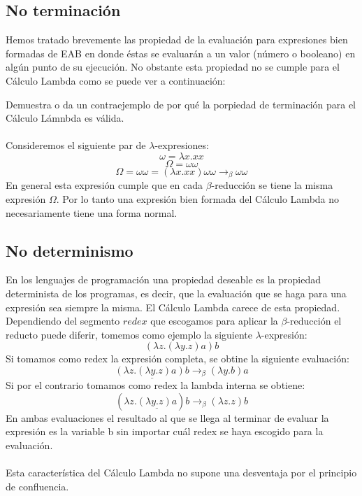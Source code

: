                 \subsection{No terminación}
                    Hemos tratado brevemente las propiedad de la evaluación para expresiones bien formadas de \textsf{EAB} en donde éstas se evaluarán a un valor (número o booleano) en algún punto de su ejecución. 
                    No obstante esta propiedad no se cumple para el Cálculo Lambda como se puede ver a continuación:
                    \begin{exercise}
                        Demuestra o da un contraejemplo de por qué la porpiedad de terminación para el Cálculo Lámnbda es válida.\\\\
                        Consideremos el siguiente par de $\lambda$-expresiones:\\
                        $$ \omega = \lambda x.xx$$
                        $$ \Omega = \omega \omega$$
                        $$ \Omega = \omega \omega = (\lambda x.xx) \omega \omega \rightarrow_\beta \omega \omega$$
                        En general esta expresión cumple que en cada $\beta$-reducción se tiene la misma expresión $\Omega$.
                        Por lo tanto una expresión bien formada del Cálculo Lambda no necesariamente tiene una forma normal.
                    \end{exercise}

                \subsection{No determinismo}
                    En los lenguajes de programación una propiedad deseable es la propiedad determinista de los programas, es decir, que la evaluación que se haga para una expresión sea siempre la misma. El Cálculo Lambda carece de esta propiedad. Dependiendo del segmento $redex$ que escogamos para aplicar la $\beta$-reducción el reducto puede diferir, tomemos como ejemplo la siguiente $\lambda$-expresión:
                    $$(\lambda z.(\lambda y.z)a)b$$
                    Si tomamos como redex la expresión completa, se obtine la siguiente evaluación: $$\underline{(\lambda z.(\lambda y.z)a)b} \rightarrow_\beta (\lambda y.b)a$$
                    Si por el contrario tomamos como redex la lambda interna se obtiene: $$(\lambda z.\underline{(\lambda y.z)a})b \rightarrow_\beta (\lambda z.z)b$$
                    En ambas evaluaciones el resultado al que se llega al terminar de evaluar la expresión es la variable b sin importar cuál redex se haya escogido para la evaluación.\\\\
                    Esta característica del Cálculo Lambda no supone una desventaja por el principio de confluencia.

